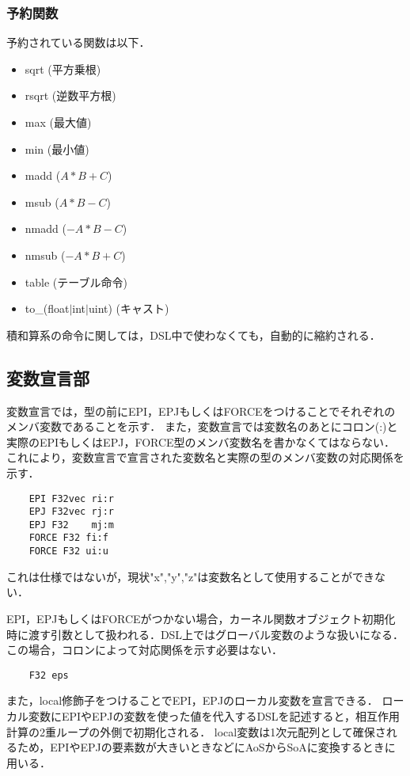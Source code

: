 \documentclass{article}
\begin{document}
 \subsubsection{予約関数}
 予約されている関数は以下．
  \begin{itemize}
   \item sqrt (平方乗根)
   \item rsqrt (逆数平方根)
   \item max (最大値)
   \item min (最小値)
   \item madd ($A*B + C$)
   \item msub ($A*B - C$)
   \item nmadd ($-A*B - C$)
   \item nmsub ($-A*B + C$)
   \item table (テーブル命令)
   \item to\_(float$|$int$|$uint) (キャスト)
  \end{itemize}
  積和算系の命令に関しては，DSL中で使わなくても，自動的に縮約される．

\subsection{変数宣言部}
変数宣言では，型の前にEPI，EPJもしくはFORCEをつけることでそれぞれのメンバ変数であることを示す．
また，変数宣言では変数名のあとにコロン(:)と実際のEPIもしくはEPJ，FORCE型のメンバ変数名を書かなくてはならない．
これにより，変数宣言で宣言された変数名と実際の型のメンバ変数の対応関係を示す．
\begin{verbatim}
	EPI F32vec ri:r
	EPJ F32vec rj:r
	EPJ F32    mj:m
	FORCE F32 fi:f
	FORCE F32 ui:u
\end{verbatim}
これは仕様ではないが，現状"x","y","z"は変数名として使用することができない．

EPI，EPJもしくはFORCEがつかない場合，カーネル関数オブジェクト初期化時に渡す引数として扱われる．DSL上ではグローバル変数のような扱いになる．
この場合，コロンによって対応関係を示す必要はない．
\begin{verbatim}
	F32 eps
\end{verbatim}

また，local修飾子をつけることでEPI，EPJのローカル変数を宣言できる．
ローカル変数にEPIやEPJの変数を使った値を代入するDSLを記述すると，相互作用計算の2重ループの外側で初期化される．
local変数は1次元配列として確保されるため，EPIやEPJの要素数が大きいときなどにAoSからSoAに変換するときに用いる．
\end{document}
